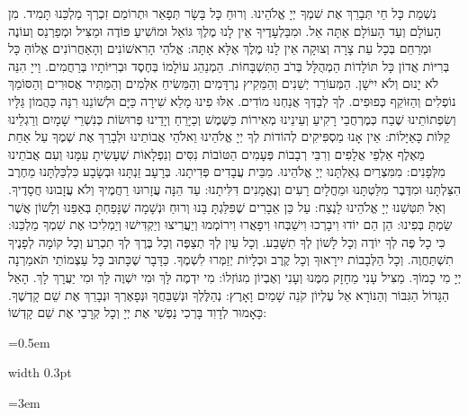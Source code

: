 \documentclass[11pt, openany]{book}
\newlength{\bidiHebWidth}
\newlength{\bidiEngWidth}
\newenvironment{bilingual}{%
  \par\vspace{4pt}%
}{%
  \noindent
  \begin{minipage}[t]{\bidiEngWidth}
    \setstretch{1.4}\emergencystretch=0.5em\normalsize
    \usebox{\bidiEngBox}
  \end{minipage}%
  \hfill
  {\color{sedergold}\vrule width 0.3pt}%
  \hfill
  \begin{minipage}[t]{\bidiHebWidth}
    \begingroup\hebrewfont\TeXXeTstate=1\beginR
    \large\setstretch{1.4}\emergencystretch=3em\tolerance=9999\parindent=0pt\relax
    \usebox{\bidiHebBox}
    \endR\endgroup
  \end{minipage}%
  \par\vspace{2pt}%
}
\newenvironment{hebrewcol}{%
  \begin{lrbox}{\bidiHebBox}\begin{minipage}{\bidiHebWidth}%
}{%
  \end{minipage}\end{lrbox}%
}
\newenvironment{englishcol}{%
  \begin{lrbox}{\bidiEngBox}\begin{minipage}{\bidiEngWidth}%
}{%
  \end{minipage}\end{lrbox}%
}
\begin{document}
\begin{bilingual}
\begin{hebrewcol}
נִשְׁמַת כָּל חַי תְּבָרֵךְ אֶת שִׁמְךָ יְיָ אֱלֹהֵינוּ. וְרוּחַ כָּל בָּשָׂר תְּפָאֵר וּתְרוֹמֵם זִכְרְךָ מַלְכֵּנוּ תָּמִיד. מִן הָעוֹלָם וְעַד הָעוֹלָם אַתָּה אֵל. וּמִבַּלְעָדֶיךָ אֵין לָנוּ מֶלֶךְ גּוֹאֵל וּמוֹשִׁיעַ פּוֹדֶה וּמַצִּיל וּמְפַרְנֵס וְעוֹנֶה וּמְרַחֵם בְּכָל עֵת צָרָה וְצוּקָה אֵין לָנוּ מֶלֶךְ אֶלָּא אָתָּה: אֱלֹהֵי הָרִאשׁוֹנִים וְהָאַחֲרוֹנִים אֱלוֹהַּ כָּל בְּרִיּוֹת אֲדוֹן כָּל תּוֹלָדוֹת הַמְהֻלָּל בְּרֹב הַתִּשְׁבָּחוֹת. הַמְנַהֵג עוֹלָמוֹ בְּחֶסֶד וּבְרִיּוֹתָיו בְּרַחֲמִים. וַייָ הִנֵּה לֹא יָנוּם וְלֹא יִישָׁן. הַמְּעוֹרֵר יְשֵׁנִים וְהַמֵּקִיץ נִרְדָּמִים וְהַמֵּשִׂיחַ אִלְּמִים וְהַמַּתִּיר אֲסוּרִים וְהַסּוֹמֵךְ נוֹפְלִים וְהַזּוֹקֵף כְּפוּפִים. לְךָ לְבַדְּךָ אֲנַחְנוּ מוֹדִים. אִלּוּ פִינוּ מָלֵא שִׁירָה כַּיָּם וּלְשׁוֹנֵנוּ רִנָּה כַּהֲמוֹן גַּלָּיו וְשִׂפְתוֹתֵינוּ שֶׁבַח כְּמֶרְחֲבֵי רָקִיעַ וְעֵינֵינוּ מְאִירוֹת כַּשֶּׁמֶשׁ וְכַיָּרֵחַ וְיָדֵינוּ פְרוּשׂוֹת כְּנִשְׁרֵי שָׁמָיִם וְרַגְלֵינוּ קַלּוֹת כָּאַיָּלוֹת: אֵין אָנוּ מַסְפִּיקִים לְהוֹדוֹת לְךָ יְיָ אֱלֹהֵינוּ וֵאלֹהֵי אֲבוֹתֵינוּ וּלְבָרֵךְ אֶת שְׁמֶךָ עַל אַחַת מֵאֶלֶף אַלְפֵי אֲלָפִים וְרִבֵּי רְבָבוֹת פְּעָמִים הַטּוֹבוֹת נִסִּים וְנִפְלָאוֹת שֶׁעָשִׂיתָ עִמָּנוּ וְעִם אֲבֹתֵינוּ מִלְּפָנִים: מִמִּצְרַיִם גְּאַלְתָּנוּ יְיָ אֱלֹהֵינוּ. מִבֵּית עֲבָדִים פְּדִיתָנוּ. בְּרָעָב זַנְתָּנוּ וּבְשָׂבָע כִּלְכַּלְתָּנוּ מֵחֶרֶב הִצַּלְתָּנוּ וּמִדֶּבֶר מִלַּטְתָּנוּ וּמֵחֳלָיִם רָעִים וְנֶאֱמָנִים דִּלִּיתָנוּ: עַד הֵנָּה עֲזָרוּנוּ רַחֲמֶיךָ וְלֹא עֲזָבוּנוּ חֲסָדֶיךָ. וְאַל תִּטְּשֵׁנוּ יְיָ אֱלֹהֵינוּ לָנֶצַח: עַל כֵּן אֵבָרִים שֶׁפִּלַּגְתָּ בָּנוּ וְרוּחַ וּנְשָׁמָה שֶׁנָּפַחְתָּ בְּאַפֵּנוּ וְלָשׁוֹן אֲשֶׁר שַׂמְתָּ בְּפִינוּ: הֵן הֵם יוֹדוּ וִיבָרְכוּ וִישַׁבְּחוּ וִיפָאֲרוּ וִירוֹמְמוּ וְיַעֲרִיצוּ וְיַקְדִּישׁוּ וְיַמְלִיכוּ אֶת שִׁמְךָ מַלְכֵּנוּ: כִּי כָל פֶּה לְךָ יוֹדֶה וְכָל לָשׁוֹן לְךָ תִשָּׁבַע. וְכָל עַיִן לְךָ תְצַפֶּה וְכָל בֶּרֶךְ לְךָ תִכְרַע וְכָל קוֹמָה לְפָנֶיךָ תִשְׁתַּחֲוֶה. וְכָל הַלְּבָבוֹת יִירָאוּךָ וְכָל קֶרֶב וּכְלָיוֹת יְזַמְּרוּ לִשְׁמֶךָ. כַּדָּבָר שֶׁכָּתוּב כָּל עַצְמוֹתַי תֹּאמַרְנָה יְיָ מִי כָמוֹךָ. מַצִּיל עָנִי מֵחָזָק מִמֶּנוּ וְעָנִי וְאֶבְיוֹן מִגּוֹזְלוֹ: מִי יִדְמֶה לָּךְ וּמִי יִשְׁוֶה לָּךְ וּמִי יַעֲרָךְ לָךְ. הָאֵל הַגָּדוֹל הַגִּבּוֹר וְהַנּוֹרָא אֵל עֶלְיוֹן קֹנֵה שָׁמַיִם וָאָרֶץ: נְהַלֶּלְךָ וּנְשַׁבֵּחֲךָ וּנְפָאֶרְךָ וּנְבָרֵךְ אֶת שֵׁם קָדְשֶׁךָ. כָּאָמוּר לְדָוִד בָּרְכִי נַפְשִׁי אֶת יְיָ וְכָל קְרָבַי אֶת שֵׁם קָדְשׁוֹ:
\end{hebrewcol}
\begin{englishcol}

\end{englishcol}
\end{bilingual}
\end{document}
